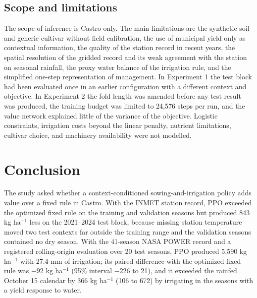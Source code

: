 \documentclass[times,final,authoryear]{elsarticle}
\begin{document}
\subsection{Scope and limitations}
\label{subdisc_limitations}

The scope of inference is Castro only. The main limitations are the synthetic soil and generic cultivar without field calibration, the use of municipal yield only as contextual information, the quality of the station record in recent years, the spatial resolution of the gridded record and its weak agreement with the station on seasonal rainfall, the proxy water balance of the irrigation rule, and the simplified one-step representation of management. In Experiment 1 the test block had been evaluated once in an earlier configuration with a different context and objective. In Experiment 2 the fold length was amended before any test result was produced, the training budget was limited to 24,576 steps per run, and the value network explained little of the variance of the objective. Logistic constraints, irrigation costs beyond the linear penalty, nutrient limitations, cultivar choice, and machinery availability were not modelled.

\section{Conclusion}
\label{conclusao}

The study asked whether a context-conditioned sowing-and-irrigation policy adds value over a fixed rule in Castro. With the INMET station record, PPO exceeded the optimized fixed rule on the training and validation seasons but produced 843 kg ha$^{-1}$ less on the 2021--2024 test block, because missing station temperature moved two test contexts far outside the training range and the validation seasons contained no dry season. With the 41-season NASA POWER record and a registered rolling-origin evaluation over 20 test seasons, PPO produced 5,590 kg ha$^{-1}$ with 27.4 mm of irrigation; its paired difference with the optimized fixed rule was $-92$ kg ha$^{-1}$ (95\% interval $-226$ to 21), and it exceeded the rainfed October 15 calendar by 366 kg ha$^{-1}$ (106 to 672) by irrigating in the seasons with a yield response to water.
\end{document}
